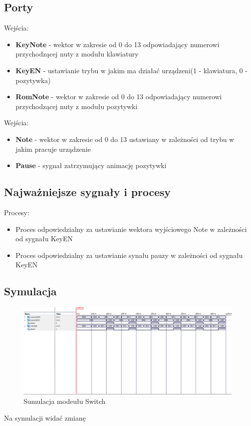 \documentclass[a4paper]{report}
\begin{document}
		\subsection{Porty}
			{\Large Wejścia:}
			\begin{itemize}	 
				\item \textbf{KeyNote} - wektor w zakresie od 0 do 13 odpowiadający numerowi przychodzącej nuty z modułu klawiatury
				\item \textbf{KeyEN} - ustawianie trybu w jakim ma działać urządzeni(1 - klawiatura, 0 - pozytywka)
				\item \textbf{RomNote} - wektor w zakresie od 0 do 13 odpowiadający numerowi przychodzącej nuty z modułu pozytywki
			\end{itemize}
		{\Large Wejścia:}
			\begin{itemize} 
				\item \textbf{Note} - wektor w zakresie od 0 do 13 ustawiany w zależności od trybu w jakim pracuje urządzenie
				\item \textbf{Pause} - sygnał zatrzymujący animację pozytywki
			\end{itemize}
		\subsection{Najważniejsze sygnały i procesy}
			{\Large Procesy:}
				\begin{itemize}
					\item Proces odpowiedzialny za ustawianie wektora wyjściowego Note w zależności od sygnału KeyEN\\
						
					\item Proces odpowiedzialny za ustawianie synału pauzy w zależności od sygnału KeyEN\\
						
				\end{itemize}
	
		\begin{landscape}
			\subsection{Symulacja}
				\begin{figure}[h!]
					\centering
					\includegraphics[width=1.6\textwidth]{switch_symulacja2.png}
					\caption{Sumulacja modeułu Switch}
				\end{figure}
		\end{landscape}
			Na symulacji widać zmianę
\end{document}
